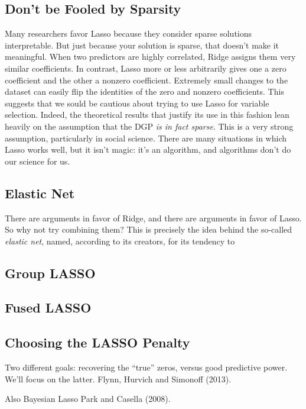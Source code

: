 \documentclass[12pt]{article}
\theoremstyle{definition}
\begin{document}
\subsection{Don't be Fooled by Sparsity}
Many researchers favor Lasso because they consider sparse solutions interpretable. But just because your solution is sparse, that doesn't make it meaningful. When two predictors are highly correlated, Ridge assigns them very similar coefficients. In contrast, Lasso more or less arbitrarily gives one a zero coefficient and the other a nonzero coefficient. Extremely small changes to the dataset can easily flip the identities of the zero and nonzero coefficients. This suggests that we sould be cautious about trying to use Lasso for variable selection. Indeed, the theoretical results that justify its use in this fashion lean heavily on the assumption that the DGP \emph{is in fact sparse}. This is a very strong assumption, particularly in social science. There are many situations in which Lasso works well, but it isn't magic: it's an algorithm, and algorithms don't do our science for us.


\subsection{Elastic Net}
There are arguments in favor of Ridge, and there are arguments in favor of Lasso. So why not try combining them? This is precisely the idea behind the so-called \emph{elastic net}, named, according to its creators, for its tendency to

\subsection{Group LASSO}

\subsection{Fused LASSO}

\subsection{Choosing the LASSO Penalty}
Two different goals: recovering the ``true'' zeros, versus good predictive power. We'll focus on the latter.
Flynn, Hurvich and Simonoff (2013).

Also Bayesian Lasso Park and Casella (2008).


\end{document}
